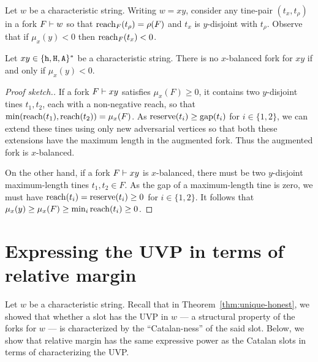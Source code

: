 Let $w$ be a characteristic string. 
Writing $w = xy$, 
consider any tine-pair $(t_x, t_\rho)$ in a fork $F \vdash w$ so that 
$\operatorname{reach}_F(t_\rho) = \rho(F)$ and $t_x$ is $y$-disjoint with $t_\rho$.
Observe that if $\mu_x(y) < 0$ then $\operatorname{reach}_F(t_x) < 0$. 

\begin{fact}\label{fact:margin-balance}
  Let $xy \in \{\mathtt{h}, \mathtt{H}, \mathtt{A}\}^*$ be a characteristic string. 
  There is no 
  $x$-balanced fork for $xy$ 
  if and only if 
  $\mu_x(y) < 0$.
\end{fact}
\begin{proof}[Proof sketch.]  
  If a fork $F \vdash xy$ 
  satisfies $\mu_x(F) \geq 0$, 
  it contains two $y$-disjoint tines $t_1, t_2$, 
  each with a non-negative reach, 
  so that $\min(\operatorname{reach}(t_1), \operatorname{reach}(t_2)) = \mu_x(F)$. 
  As $\operatorname{reserve}(t_i) \geq \operatorname{gap}(t_i)$ for $i \in \{1,2\}$, 
  we can extend these tines using only new adversarial vertices 
  so that both these extensions 
  have the maximum length 
  in the augmented fork. 
  Thus the augmented fork is $x$-balanced.

  On the other hand, if a fork $F \vdash xy$ is $x$-balanced, 
  there must be two $y$-disjoint 
  maximum-length tines $t_1, t_2 \in F$. 
  As the gap of a maximum-length tine is zero, 
  we must have $\operatorname{reach}(t_i) = \operatorname{reserve}(t_i) \geq 0$ 
  for $i \in \{1, 2\}$. 
  It follows that $\mu_x(y) \geq \mu_x(F) \geq \min_i \operatorname{reach}(t_i) \geq 0$.
\end{proof}



\section[Expressing the UVP]{Expressing the UVP in terms of relative margin}
Let $w$ be a characteristic string. 
Recall that in Theorem~\ref{thm:unique-honest}, 
we showed that whether a slot has the UVP in $w$ --- a 
structural property of the forks for $w$ --- is 
characterized by the ``Catalan-ness'' of the said slot. 
Below, we show that relative margin 
has the same expressive power 
as the Catalan slots 
in terms of characterizing the UVP. 


